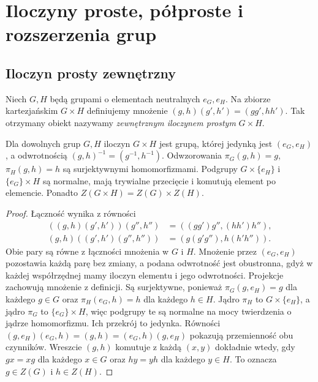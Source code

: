 \chapter[Iloczyny i rozszerzenia grup]{Iloczyny proste, półproste i rozszerzenia grup}
\label{aa:ch:konstrukcje-grup}

\section{Iloczyn prosty zewnętrzny}
\begin{definicja}
\label{aa:def:directproduct}
Niech $G,H$ będą grupami o elementach neutralnych $e_G,e_H$.
Na zbiorze kartezjańskim $G\times H$ definiujemy mnożenie
$(g,h)(g',h')=(gg',hh')$.
Tak otrzymany obiekt nazywamy \emph{zewnętrznym iloczynem prostym}
$G\times H$.
\end{definicja}
\begin{twierdzenie}
\label{aa:tw:direct-product}
Dla dowolnych grup $G,H$ iloczyn $G\times H$ jest grupą,
której jedynką jest $(e_G,e_H)$, a odwrotnością
$(g,h)^{-1}=(g^{-1},h^{-1})$.
Odwzorowania $\pi_G(g,h)=g$, $\pi_H(g,h)=h$ są surjektywnymi
homomorfizmami. Podgrupy $G\times\{e_H\}$ i
$\{e_G\}\times H$ są normalne, mają trywialne przecięcie
i komutują element po elemencie.
Ponadto $Z(G\times H)=Z(G)\times Z(H)$.
\end{twierdzenie}
\begin{proof}
Łączność wynika z równości
\begin{align*}
((g,h)(g',h'))(g'',h'')&=((gg')g'',(hh')h''),\\
(g,h)((g',h')(g'',h''))&=(g(g'g''),h(h'h'')).
\end{align*}
Obie pary są równe z łączności mnożenia w $G$ i $H$.
Mnożenie przez $(e_G,e_H)$ pozostawia każdą parę bez zmiany,
a podana odwrotność jest obustronna, gdyż w każdej współrzędnej
mamy iloczyn elementu i jego odwrotności.
Projekcje zachowują mnożenie z definicji. Są surjektywne,
ponieważ $\pi_G(g,e_H)=g$ dla każdego $g\in G$
oraz $\pi_H(e_G,h)=h$ dla każdego $h\in H$.
Jądro $\pi_H$ to $G\times\{e_H\}$,
a jądro $\pi_G$ to $\{e_G\}\times H$, więc podgrupy
te są normalne na mocy twierdzenia o jądrze homomorfizmu.
Ich przekrój to jedynka. Równości
$(g,e_H)(e_G,h)=(g,h)=(e_G,h)(g,e_H)$
pokazują przemienność obu czynników.
Wreszcie $(g,h)$ komutuje z każdą $(x,y)$ dokładnie wtedy,
gdy $gx=xg$ dla każdego $x\in G$ oraz $hy=yh$ dla każdego
$y\in H$. To oznacza $g\in Z(G)$ i $h\in Z(H)$.
\end{proof}

